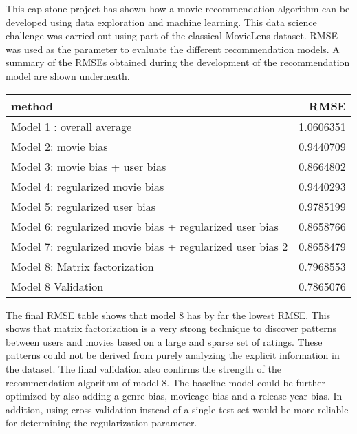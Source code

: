 \documentclass[
]{article}
\begin{document}
This cap stone project has shown how a movie recommendation algorithm
can be developed using data exploration and machine learning. This data
science challenge was carried out using part of the classical MovieLens
dataset. RMSE was used as the parameter to evaluate the different
recommendation models. A summary of the RMSEs obtained during the
development of the recommendation model are shown underneath.

\begin{longtable}[]{@{}lr@{}}
\toprule
method & RMSE\tabularnewline
\midrule
\endhead
Model 1 : overall average & 1.0606351\tabularnewline
Model 2: movie bias & 0.9440709\tabularnewline
Model 3: movie bias + user bias & 0.8664802\tabularnewline
Model 4: regularized movie bias & 0.9440293\tabularnewline
Model 5: regularized user bias & 0.9785199\tabularnewline
Model 6: regularized movie bias + regularized user bias &
0.8658766\tabularnewline
Model 7: regularized movie bias + regularized user bias 2 &
0.8658479\tabularnewline
Model 8: Matrix factorization & 0.7968553\tabularnewline
Model 8 Validation & 0.7865076\tabularnewline
\bottomrule
\end{longtable}

The final RMSE table shows that model 8 has by far the lowest RMSE. This
shows that matrix factorization is a very strong technique to discover
patterns between users and movies based on a large and sparse set of
ratings. These patterns could not be derived from purely analyzing the
explicit information in the dataset. The final validation also confirms
the strength of the recommendation algorithm of model 8. The baseline
model could be further optimized by also adding a genre bias, movieage
bias and a release year bias. In addition, using cross validation
instead of a single test set would be more reliable for determining the
regularization parameter.
\end{document}
